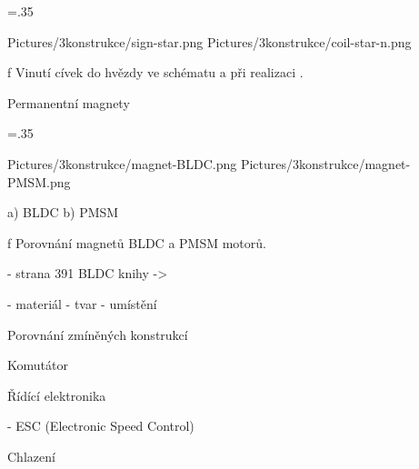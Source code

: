 \medskip
\picw=.35\hsize
{} %
\centerline {\inspic Pictures/3konstrukce/sign-star.png  \hfil\hfil \inspic Pictures/3konstrukce/coil-star-n.png  }\nobreak
\caption/f Vinutí cívek do hvězdy ve schématu a při realizaci .
 \medskip


 \sec Permanentní magnety

 \medskip
 \picw=.35\hsize
 \centerline {\inspic Pictures/3konstrukce/magnet-BLDC.png \hfil\hfil \inspic Pictures/3konstrukce/magnet-PMSM.png }\nobreak
 \centerline {a) BLDC \hfil\hfil b) PMSM }\nobreak\medskip
 \caption/f Porovnání magnetů BLDC a PMSM motorů.
  \medskip

 - strana 391 BLDC knihy ->

- materiál
- tvar
- umístění

\sec Porovnání zmíněných konstrukcí

 \sec Komutátor

 \sec Řídící elektronika

 - ESC (Electronic Speed Control)

 \sec Chlazení

 